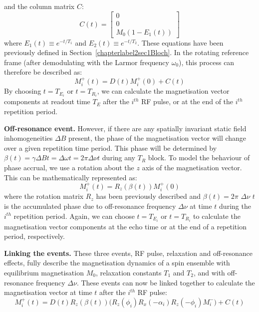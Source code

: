 and the column matrix $C$:
\begin{equation}
    C ( t ) = \left[
    \begin{array}{c}
        0 \\
        0 \\
    M_0(1 - E_1(t))
    \end{array}
    \right]
\end{equation}
where $E_1(t) \equiv e^{-t/T_1}$ and $E_2(t) \equiv e^{-t/T_2}$.
These equations have been previously defined in Section~\ref{chapterlabel2sec1Bloch}.
In the rotating reference frame (after demodulating with the Larmor frequency $\omega_0$), this process can therefore be described as:
\begin{equation}
    M^{+}_i (t)  = D(t) M^{+}_i (0) + C(t)
\end{equation}
By choosing $t = T_{E_i}$ or $t = T_{R_i}$, we can calculate the magnetisation vector components at readout time $T_E$ after the $i^{th}$ RF pulse, or at the end of the $i^{th}$ repetition period.

\hfill

\textbf{Off-resonance event.} However, if there are any spatially invariant static field inhomogeneities $\Delta B$ present, the phase of the magnetisation vector will change over a given repetition time period. 
This phase will be determined by $\beta(t) = \gamma \Delta B t = \Delta \omega t = 2\pi \Delta \nu t$ during any $T_R$ block.
To model the behaviour of phase accrual, we use a rotation about the $z$ axis of the magnetisation vector.
This can be mathematically represented as:
\begin{equation}
    M^{+}_i (t)  = R_z(\beta(t)) M^{+}_i (0)
\end{equation}
where the rotation matrix $R_z$ has been previously described and $\beta(t) = 2\pi \, \, \Delta \nu \, \, t$ is the accumulated phase due to off-resonance frequency $\Delta \nu$ at time $t$ during the $i^{th}$ repetition period. 
Again, we can choose $t = T_{E_i}$ or $t = T_{R_i}$ to calculate the magnetisation vector components at the echo time or at the end of a repetition period, respectively.

\hfill

\textbf{Linking the events.} These three events, RF pulse, relaxation and off-resonance effects, fully describe the magnetisation dynamics of a spin ensemble with equilibrium magnetisation $M_0$, relaxation constants $T_1$ and $T_2$, and with off-resonance frequency $\Delta \nu$.
These events can now be linked together to calculate the magnetisation vector at time $t$ after the $i^{th}$ RF pulse:
\begin{equation}
    M^{+}_i (t) = D(t) R_z(\beta(t)) \big( R_{z}(\phi_i) R_{x}(-\alpha_i) R_{z}(-\phi_i) M^{-}_i \big) + C(t)
\end{equation}

